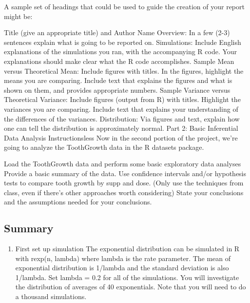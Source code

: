 \documentclass[]{article}
\providecommand{\tightlist}{%
  \setlength{\itemsep}{0pt}\setlength{\parskip}{0pt}}
\begin{document}
A sample set of headings that could be used to guide the creation of
your report might be:

Title (give an appropriate title) and Author Name Overview: In a few
(2-3) sentences explain what is going to be reported on. Simulations:
Include English explanations of the simulations you ran, with the
accompanying R code. Your explanations should make clear what the R code
accomplishes. Sample Mean versus Theoretical Mean: Include figures with
titles. In the figures, highlight the means you are comparing. Include
text that explains the figures and what is shown on them, and provides
appropriate numbers. Sample Variance versus Theoretical Variance:
Include figures (output from R) with titles. Highlight the variances you
are comparing. Include text that explains your understanding of the
differences of the variances. Distribution: Via figures and text,
explain how one can tell the distribution is approximately normal. Part
2: Basic Inferential Data Analysis Instructionsless Now in the second
portion of the project, we're going to analyze the ToothGrowth data in
the R datasets package.

Load the ToothGrowth data and perform some basic exploratory data
analyses Provide a basic summary of the data. Use confidence intervals
and/or hypothesis tests to compare tooth growth by supp and dose. (Only
use the techniques from class, even if there's other approaches worth
considering) State your conclusions and the assumptions needed for your
conclusions.

\subsection{Summary}\label{summary}

\begin{enumerate}
\def\labelenumi{\arabic{enumi}.}
\tightlist
\item
  First set up simulation The exponential distribution can be simulated
  in R with rexp(n, lambda) where lambda is the rate parameter. The mean
  of exponential distribution is 1/lambda and the standard deviation is
  also 1/lambda. Set lambda = 0.2 for all of the simulations. You will
  investigate the distribution of averages of 40 exponentials. Note that
  you will need to do a thousand simulations.
\end{enumerate}
\end{document}
